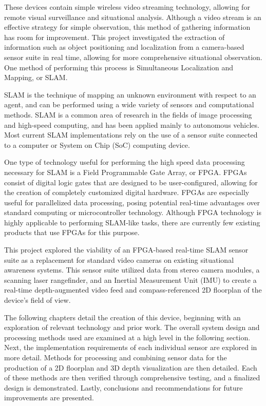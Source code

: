 These devices contain simple wireless video streaming technology, allowing for remote visual surveillance and situational analysis. Although a video stream is an effective strategy for simple observation, this method of gathering information has room for improvement. This project investigated the extraction of information such as object positioning and localization from a camera-based sensor suite in real time, allowing for more comprehensive situational observation. One method of performing this process is Simultaneous Localization and Mapping, or SLAM.
\par
SLAM is the technique of mapping an unknown environment with respect to an agent, and can be performed using a wide variety of sensors and computational methods. SLAM is a common area of research in the fields of image processing and high-speed computing, and has been applied mainly to autonomous vehicles. Most current SLAM implementations rely on the use of a sensor suite connected to a computer or System on Chip (SoC) computing device.
\par
One type of technology useful for performing the high speed data processing necessary for SLAM is a Field Programmable Gate Array, or FPGA. FPGAs consist of digital logic gates that are designed to be user-configured, allowing for the creation of completely customized digital hardware. FPGAs are especially useful for parallelized data processing, posing potential real-time advantages over standard computing or microcontroller technology. Although FPGA technology is highly applicable to performing SLAM-like tasks, there are currently few existing products that use FPGAs for this purpose.
\par
This project explored the viability of an FPGA-based real-time SLAM sensor suite as a replacement for standard video cameras on existing situational awareness systems. This sensor suite utilized data from stereo camera modules, a scanning laser rangefinder, and an Inertial Measurement Unit (IMU) to create a real-time depth-augmented video feed and compass-referenced 2D floorplan of the device's field of view.
\par
The following chapters detail the creation of this device, beginning with an exploration of relevant technology and prior work. The overall system design and processing methods used are examined at a high level in the following section. Next, the implementation requirements of each individual sensor are explored in more detail. Methods for processing and combining sensor data for the production of a 2D floorplan and 3D depth visualization are then detailed. Each of these methods are then verified through comprehensive testing, and a finalized design is demonstrated. Lastly, conclusions and recommendations for future improvements are presented.




